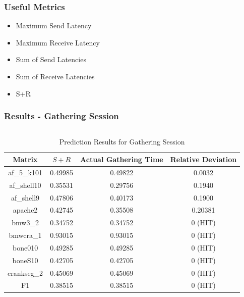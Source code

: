\documentclass{beamer}
\begin{document}
\begin{frame}
\frametitle{Useful Metrics}
\begin{itemize}
\item Maximum Send Latency
\item Maximum Receive Latency
\item Sum of Send Latencies
\item Sum of Receive Latencies
\item S+R
\end{itemize}
\end{frame}
\begin{frame}
\frametitle{Results - Gathering Session}
\begin{columns}[c]
\begin{table}[h!]
\centering
\caption{Prediction Results for Gathering Session}
\begin{tabular}{|c|c|c|c|}
\hline
Matrix & $S+R$ & Actual Gathering Time & Relative Deviation \\
\hline
af\_5\_k101 & 0.49985 & 0.49822 & 0.0032 \\
af\_shell10 & 0.35531 & 0.29756 & 0.1940 \\
af\_shell9 & 0.47806 & 0.40173 & 0.1900 \\
apache2 & 0.42745 & 0.35508 & 0.20381\\
bmw3\_2 & 0.34752 & 0.34752 & 0 (HIT) \\
bmwcra\_1 & 0.93015 & 0.93015 & 0 (HIT) \\
bone010 & 0.49285 & 0.49285 & 0 (HIT) \\
boneS10 & 0.42705 & 0.42705 & 0 (HIT) \\
crankseg\_2 & 0.45069 & 0.45069 & 0 (HIT) \\
F1 & 0.38515 & 0.38515 & 0 (HIT) \\
\hline
\end{tabular}
\end{table}

\end{columns}
\end{frame}
\end{document}
